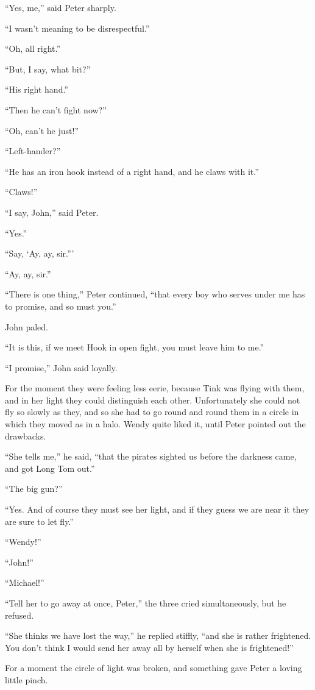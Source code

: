 ``Yes, me,'' said Peter sharply.

``I wasn't meaning to be disrespectful.''

``Oh, all right.''

``But, I say, what bit?''

``His right hand.''

``Then he can't fight now?''

``Oh, can't he just!''

``Left-hander?''

``He has an iron hook instead of a right hand, and he claws with it.''

``Claws!''

``I say, John,'' said Peter.

``Yes.''

``Say, ‘Ay, ay, sir.'''

``Ay, ay, sir.''

``There is one thing,'' Peter continued, ``that every boy who serves under me
has to promise, and so must you.''

John paled.

``It is this, if we meet Hook in open fight, you must leave him to me.''

``I promise,'' John said loyally.

For the moment they were feeling less eerie, because Tink was flying with them,
and in her light they could distinguish each other.
Unfortunately she could not fly so slowly as they, and so she had to go round
and round them in a circle in which they moved as in a halo.
Wendy quite liked it, until Peter pointed out the drawbacks.

``She tells me,'' he said, ``that the pirates sighted us before the darkness
came, and got Long Tom out.''

``The big gun?''

``Yes.
And of course they must see her light, and if they guess we are near it they are
sure to let fly.''

``Wendy!''

``John!''

``Michael!''

``Tell her to go away at once, Peter,'' the three cried simultaneously, but he
refused.

``She thinks we have lost the way,'' he replied stiffly, ``and she is rather
frightened.
You don't think I would send her away all by herself when she is frightened!''

For a moment the circle of light was broken, and something gave Peter a loving
little pinch.

